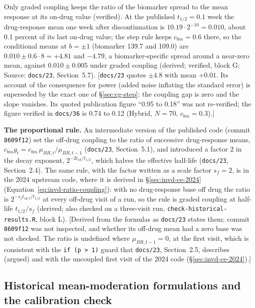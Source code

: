 \documentclass[11pt]{article}
\newcommand{\note}[1]{\textcolor{blue!60!black}{\small [#1]}}
\newcommand{\code}[1]{\texttt{#1}}
\begin{document}
Only graded coupling keeps the ratio of the biomarker spread to the mean
response at its on-drug value (verified). At the published
$t_{1/2} = 0.1$ week the drug-response mean one week after
discontinuation is $10.19\cdot2^{-10} = 0.010$, about 0.1 percent of
its last on-drug value; the step rule keeps $c_{bm} = 0.6$ there, so the
conditional means at $b = \pm1$ (biomarker 139.7 and 109.0) are
$0.010 \pm 0.6\cdot8 = +4.81$ and $-4.79$, a biomarker-specific spread
around a near-zero mean, against $0.010 \pm 0.005$ under graded
coupling (derived; verified, block G; Source: \code{docs/23},
Section~5.7). \note{\code{docs/23} quotes $\pm4.8$ with mean $+0.01$.
Its account of the consequence for power (added noise inflating the
standard error) is superseded by the exact one of \S\ref{sec:cg-step}:
the coupling gap is zero and the slope vanishes. Its quoted
publication figure ``0.95 to 0.18'' was not re-verified; the figure
verified in \code{docs/36} is 0.74 to 0.12 (Hybrid, $N = 70$,
$c_{bm} = 0.3$).}

\textbf{The proportional rule.} An intermediate version of the
published code (commit \code{8609f12}) set the off-drug coupling to the
ratio of successive drug-response means, $c_{bm}g_t = c_{bm}\,
\mu_{BR,t}/\mu_{BR,t-1}$ (\code{docs/23}, Section~5.1), and introduced
a factor 2 in the decay exponent, $2^{-2t_{sd}/t_{1/2}}$, which halves
the effective half-life (\code{docs/23}, Section~2.4). The same rule,
with the factor written as a scale factor $s_f = 2$, is in the 2024
upstream code, where it is derived in \S\ref{sec:invd-ce-2024}
(Equation~\eqref{eq:invd-ratio-coupling}): with no drug-response base
off drug the ratio is $2^{-s_f t_{sd,t}/t_{1/2}}$ at every off-drug
visit of a run, so the rule is graded coupling at half-life $t_{1/2}/s_f$
(derived; also checked on a three-visit run, \code{check-historical-results.R},
block L). \note{Derived from the formulas as \code{docs/23} states
them; commit \code{8609f12} was not inspected, and whether its off-drug
mean had a zero base was not checked. The ratio is undefined where
$\mu_{BR,t-1} = 0$, at the first visit, which is consistent with the
\code{if (p > 1)} guard that \code{docs/23}, Section~2.5, describes
(argued) and with the uncoupled first visit of the 2024 code
(\S\ref{sec:invd-ce-2024}).}

\subsection{Historical mean-moderation formulations and the calibration
check}
\label{sec:inva-history}
\end{document}
